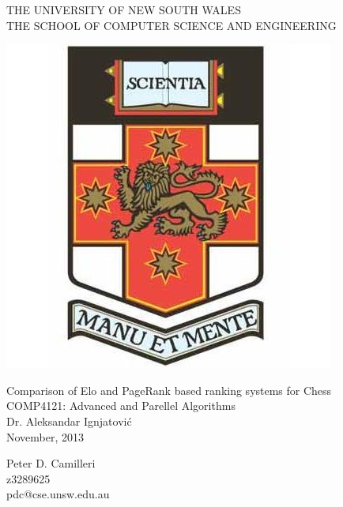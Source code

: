 \documentclass[pdftex,11pt,a4paper]{report}
\begin{document}
\thispagestyle{empty}
\begin{titlepage}
  \null\vskip1.5cm
  \begin{center}
    {\rmfamily\Large THE UNIVERSITY OF NEW SOUTH WALES \\ 
       THE SCHOOL OF COMPUTER SCIENCE AND ENGINEERING}
  \end{center}
  \vskip1cm
  \begin{center}
  \includegraphics[scale=0.3]{logoUNSW.jpg}
  \end{center}
  \vskip2cm
  \begin{center}
     {\rmfamily\Large Comparison of Elo and PageRank based ranking systems for Chess} \\
     {\rmfamily\normalsize COMP4121: Advanced and Parellel Algorithms} \\
     {\rmfamily\normalsize Dr. Aleksandar Ignjatovi\'{c} \\ November, 2013} \\
  \end{center}
  \vskip2cm
  \begin{center}
  \end{center}
  \begin{center}
     {\rmfamily\Large Peter D. Camilleri \\ 
                      z3289625 \\ 
                      pdc@cse.unsw.edu.au \\
}
  \end{center}
  
  
  \vfill
\end{titlepage}
\newpage
\end{document}
